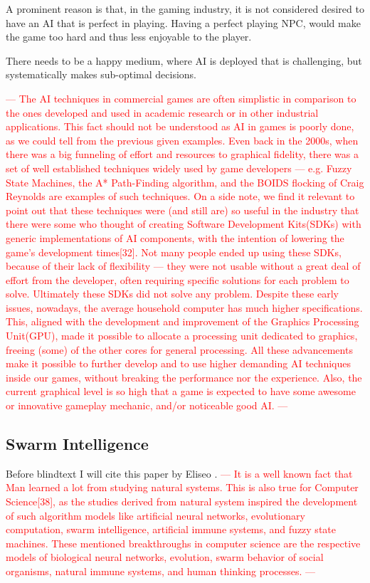 A prominent reason is that, in the gaming industry, it is not considered desired to have an AI that is perfect in playing.
Having a perfect playing NPC, would make the game too hard and thus less enjoyable to the player.

There needs to be a happy medium, where AI is deployed that is challenging, but systematically makes sub-optimal decisions.

\textcolor{red}{---
The AI techniques in commercial games are often simplistic in comparison to the ones developed and used in academic research or in other industrial applications. 
This fact should not be understood as AI in games is poorly done, 
as we could tell from the previous given examples. 
Even back in the 2000s, when there was a big funneling of effort and resources to graphical fidelity, 
there was a set of well established techniques widely used by game developers — e.g. 
Fuzzy State Machines, 
the A* Path-Finding
algorithm, 
and the BOIDS flocking of Craig Reynolds are examples of such techniques.
On a side note, we find it relevant to point out that these techniques were (and still are) so useful in the industry that there were some who thought of creating 
Software Development Kits(SDKs) with generic implementations of AI components, with the intention of lowering the game’s development times[32].
Not many people ended up using these SDKs, because of their lack of flexibility — they were not usable without a great deal of effort from the developer, 
often requiring specific solutions for each problem to solve. 
Ultimately these SDKs did not solve any problem.
Despite these early issues, nowadays, the average household computer has much higher specifications. This, aligned with the development and improvement of the Graphics Processing Unit(GPU),
made it possible to allocate a processing unit dedicated to graphics, freeing (some) of the other cores for general processing. 
All these advancements make it possible to further develop and to use higher demanding AI techniques inside our games, without breaking the performance nor the experience. 
Also, the current graphical level is so high that a game is expected to have some awesome or innovative gameplay mechanic, and/or noticeable good AI.
---}


\subsection{Swarm Intelligence} \label{subsection:swarm_intelligence}
Before blindtext I will cite this paper by Eliseo \cite{brambilla2013swarm}.
\textcolor{red}{---
It is a well known fact that Man learned a lot from studying natural systems. 
This is also true for Computer Science[38], as the studies derived from natural system inspired the development of such algorithm models like 
artificial neural networks, 
evolutionary computation, 
swarm intelligence, artificial immune systems, 
and fuzzy state machines. 
These mentioned breakthroughs in computer science are the respective models of biological neural networks, 
evolution, 
swarm behavior of social organisms, 
natural immune systems, 
and human thinking processes.
---}

